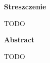\begin{abstracts}
	\begin{center}{\Large\bfseries Streszczenie \par}\end{center}\vspace{0.5em}
	TODO

	\begin{center}{\Large\bfseries Abstract \par}\end{center}\vspace{0.5em}
	TODO
\end{abstracts}
